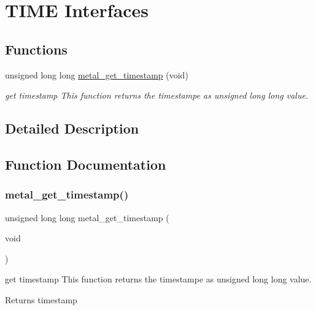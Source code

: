 \hypertarget{group__time}{}\section{T\+I\+ME Interfaces}
\label{group__time}
\subsection*{Functions}
\begin{DoxyCompactItemize}
\item 
unsigned long long \hyperlink{group__time_ga82a648fbce405ec417db59ab070cb38a}{metal\+\_\+get\+\_\+timestamp} (void)
\begin{DoxyCompactList}\small\item\em get timestamp This function returns the timestampe as unsigned long long value. \end{DoxyCompactList}\end{DoxyCompactItemize}


\subsection{Detailed Description}


\subsection{Function Documentation}
\mbox{\label{group__time_ga82a648fbce405ec417db59ab070cb38a}} 
\subsubsection{\texorpdfstring{metal\+\_\+get\+\_\+timestamp()}{metal\_get\_timestamp()}}
{\footnotesize\ttfamily unsigned long long metal\+\_\+get\+\_\+timestamp (\begin{DoxyParamCaption}\item[{void}]{ }\end{DoxyParamCaption})}



get timestamp This function returns the timestampe as unsigned long long value. 

\begin{DoxyReturn}{Returns}
timestamp 
\end{DoxyReturn}
